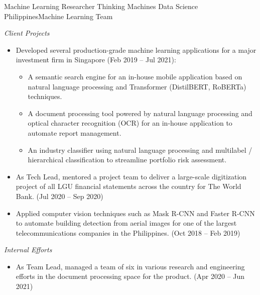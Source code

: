 \documentclass[12pt,a4paper]{moderncv}
\begin{document}
{Machine Learning Researcher}
{Thinking Machines Data Science}
{Philippines}{Machine Learning Team}
{
    \vspace{3px}
    \textit{Client Projects}
    \begin{itemize}
        \item Developed several production-grade machine learning applications
            for a major investment firm in Singapore (Feb 2019 -- Jul 2021): 
            \begin{itemize}
                \item A semantic search engine for an in-house mobile
                    application based on natural language processing and
                    Transformer (DistilBERT, RoBERTa) techniques. 
                \item A document processing tool powered by natural language
                    processing and optical character recognition (OCR) for an
                    in-house application to automate report management.
                \item An industry classifier using natural language processing
                    and multilabel / hierarchical classification to
                    streamline portfolio risk assessment. 
            \end{itemize}
        \item As Tech Lead, mentored a project team to deliver a large-scale
            digitization project of all LGU financial statements across the
            country for The World Bank.  (Jul 2020 -- Sep 2020)
        \item Applied computer vision techniques such as Mask R-CNN and Faster
            R-CNN to automate building detection from aerial images for one of
            the largest telecommunications companies in the Philippines. (Oct
            2018 -- Feb 2019)
    \end{itemize}
    \vspace{3px}
    \textit{Internal Efforts}
    \begin{itemize}
        \item As Team Lead, managed a team of six in various research and
            engineering efforts in the document processing space for the
            {\color{blue}}
            product. (Apr 2020 -- Jun 2021)
    \end{itemize}
}

\end{document}
